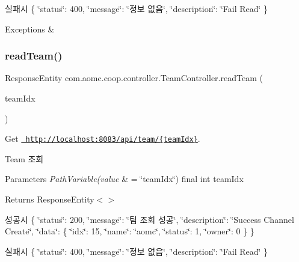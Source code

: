 실패시 \{ \char`\"{}status\char`\"{}\+: 400, \char`\"{}message\char`\"{}\+: \char`\"{}정보 없음\char`\"{}, \char`\"{}description\char`\"{}\+: \char`\"{}\+Fail Read\char`\"{} \}


\begin{DoxyExceptions}{Exceptions}
{\em } & \\
\hline
\end{DoxyExceptions}
\mbox{\label{classcom_1_1aomc_1_1coop_1_1controller_1_1_team_controller_ae58612664e52e32d503efa3008565826}} 
\subsubsection{\texorpdfstring{readTeam()}{readTeam()}}
{\footnotesize\ttfamily Response\+Entity com.\+aomc.\+coop.\+controller.\+Team\+Controller.\+read\+Team (\begin{DoxyParamCaption}\item[{@Path\+Variable(value=\char`\"{}team\+Idx\char`\"{}) final int}]{team\+Idx }\end{DoxyParamCaption})}



Get \href{http://localhost:8083/api/team/{teamIdx}}{\texttt{ http\+://localhost\+:8083/api/team/\{team\+Idx\}}}. 

Team 조회


\begin{DoxyParams}{Parameters}
{\em Path\+Variable(value} & = \char`\"{}team\+Idx\char`\"{}) final int team\+Idx\\
\hline
\end{DoxyParams}
\begin{DoxyReturn}{Returns}
Response\+Entity$<$$>$
\end{DoxyReturn}
성공시 \{ \char`\"{}status\char`\"{}\+: 200, \char`\"{}message\char`\"{}\+: \char`\"{}팀 조회 성공\char`\"{}, \char`\"{}description\char`\"{}\+: \char`\"{}\+Success Channel Create\char`\"{}, \char`\"{}data\char`\"{}\+: \{ \char`\"{}idx\char`\"{}\+: 15, \char`\"{}name\char`\"{}\+: \char`\"{}aomc\char`\"{}, \char`\"{}status\char`\"{}\+: 1, \char`\"{}owner\char`\"{}\+: 0 \} \}

실패시 \{ \char`\"{}status\char`\"{}\+: 400, \char`\"{}message\char`\"{}\+: \char`\"{}정보 없음\char`\"{}, \char`\"{}description\char`\"{}\+: \char`\"{}\+Fail Read\char`\"{} \}


